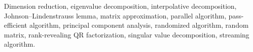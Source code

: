 \documentclass[final]{siamltex}
\newcounter{algorithm}[section]
\newcommand{\pgnotate}[1]{{\color{blue}[#1]}}
\begin{document}
\begin{abstract}


\end{abstract}

\begin{keywords}
Dimension reduction, eigenvalue decomposition, interpolative decomposition,
Johnson--Lindenstrauss lemma,
matrix approximation, parallel algorithm, pass-efficient algorithm, principal component analysis,
randomized algorithm, random matrix, rank-revealing QR factorization, singular value decomposition,
streaming algorithm.
\end{keywords}
\end{document}
